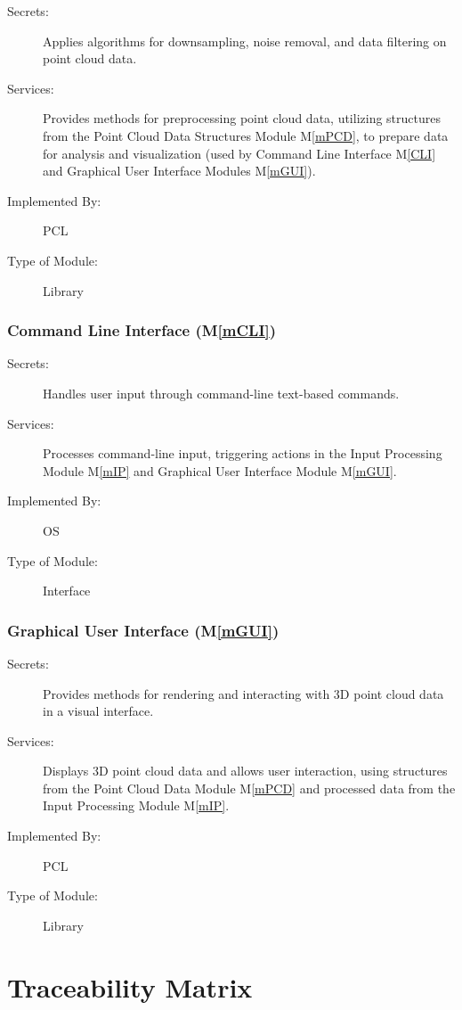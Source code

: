\documentclass[12pt, titlepage]{article}
\newcommand{\mref}[1]{M\ref{#1}}
\begin{document}
\begin{description}
\item[Secrets:] Applies algorithms for downsampling, noise removal, and data filtering on point cloud data.
\item[Services:] Provides methods for preprocessing point cloud data, utilizing structures from the Point Cloud Data Structures Module \mref{mPCD}, 
  to prepare data for analysis and visualization (used by Command Line Interface \mref{CLI} and Graphical User Interface Modules \mref{mGUI}).
\item[Implemented By:] PCL
\item[Type of Module:] Library
\end{description}

\subsubsection{Command Line Interface (\mref{mCLI})}

\begin{description}
\item[Secrets:] Handles user input through command-line text-based commands.
\item[Services:] Processes command-line input, triggering actions in the Input Processing Module \mref{mIP}
  and Graphical User Interface Module \mref{mGUI}.
\item[Implemented By:] OS
\item[Type of Module:] Interface
\end{description}

\subsubsection{Graphical User Interface (\mref{mGUI})}

\begin{description}
\item[Secrets:] Provides methods for rendering and interacting with 3D point cloud data in a visual interface.
\item[Services:] Displays 3D point cloud data and allows user interaction, using structures from the Point Cloud Data Module \mref{mPCD} 
  and processed data from the Input Processing Module \mref{mIP}.
\item[Implemented By:] PCL
\item[Type of Module:] Library
\end{description}

\section{Traceability Matrix} \label{SecTM}
\end{document}
